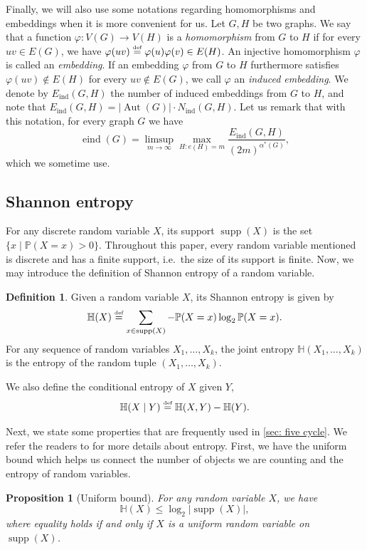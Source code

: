 \documentclass[reqno,11pt]{amsart}
\numberwithin{equation}{section}
\newtheorem{proposition}[theorem]{Proposition}
\theoremstyle{definition}
\newtheorem{definition}[theorem]{Definition}
\theoremstyle{remark}
\newcommand{\abs}[1]{\left\lvert#1\right\rvert}
\DeclareMathOperator{\ind}{ind}
\DeclareMathOperator{\eind}{eind}
\DeclareMathOperator{\Aut}{Aut}
\DeclareMathOperator{\supp}{supp}
\newcommand*{\eqdef}{\stackrel{\mbox{\normalfont\tiny def}}{=}}
\newcommand*{\PP}{\mathbb{P}}
\newcommand{\HH}{\mathbb{H}}
\begin{document}
Finally, we will also use some notations regarding homomorphisms and embeddings when it is more convenient for us.
Let $G,H$ be two graphs.
We say that a function $\varphi\colon V(G)\to V(H)$ is a \emph{homomorphism} from $G$ to $H$ if for every $uv\in E(G)$, we have $\varphi (uv)\eqdef \varphi(u)\varphi(v)\in E(H)$. 
An injective homomorphism $\varphi$ is called an \emph{embedding}. 
If an embedding $\varphi$ from $G$ to $H$ furthermore satisfies $\varphi(uv)\not\in E(H)$ for every $uv\not\in E(G)$, we call $\varphi$ an \emph{induced embedding}. 
We denote by $E_{\ind}(G,H)$ the number of induced embeddings from $G$ to $H$, and note that $E_{\ind}(G,H)=\abs{\Aut(G)} \cdot N_{\ind}(G,H)$.
Let us remark that with this notation, for every graph $G$ we have
\[
	\eind(G) = \limsup_{m\to\infty} \max_{H: e(H)=m}\frac{E_{\ind}(G,H)}{(2m)^{\alpha^*(G)}},
\]
which we sometime use.



\subsection{Shannon entropy}
For any discrete random variable $X$, its support $\supp(X)$ is the set $\{x\mid \PP(X=x)>0\}$. Throughout this paper, every random variable mentioned is discrete and has a finite support, i.e.\ the size of its support is finite. Now, we may introduce the definition of Shannon entropy of a random variable.


\begin{definition}
    Given a random variable $X$, its Shannon entropy is given by
    \[\HH(X)\eqdef \sum_{x\in\supp(X)}-\PP(X=x)\log_2\PP(X=x).\]
    For any sequence of random variables $X_1,\dots,X_k$, the joint entropy $\HH(X_1,\dots,X_k)$ is the entropy of the random tuple $(X_1,\dots,X_k)$. 

    We also define the conditional entropy of $X$ given $Y$, 
    \[\HH(X\mid Y)\eqdef \HH(X,Y)-\HH(Y).\]
\end{definition}

Next, we state some properties that are frequently used in \cref{sec: five cycle}. We refer the readers to \cite{AS00,Gal2014} for more details about entropy. First, we have the uniform bound which helps us connect the number of objects we are counting and the entropy of random variables.

\begin{proposition}[Uniform bound]
    For any random variable $X$, we have
    \[\HH(X)\leq \log_2\abs{\supp(X)},\]
    where equality holds if and only if $X$ is a uniform random variable on $\supp(X)$.
\end{proposition}
\end{document}
